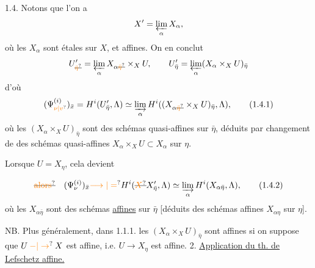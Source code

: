 1.4. Notons que l'on a
\[
X'=\varprojlim_\alpha X_\alpha,
\]
où les $X_\alpha$ sont étales sur $X$, et affines. On en conclut
\[
U'_{\deleted{\unsure{\bar\eta}}}=\varprojlim_\alpha X_{\alpha\deleted{\unsure{\bar\eta}}}\times_X U,\qquad
U'_{\bar\eta}=\varprojlim_\alpha(X_\alpha\times_X U)_{\bar\eta}
\]
d'où
\[
(\Psi^{(i)}_{\unsure{\nu|v}})_{\bar x}=H^i(U'_{\bar\eta},\Lambda)\simeq
\varinjlim_\alpha H^i((X_{\alpha\deleted{\unsure{\bar\eta}}}\times_X U)_{\bar\eta},\Lambda),
\tag*{(1.4.1)}
\]
où les  $(X_\alpha\times_X U)_{\bar\eta}$ sont des schémas  quasi-affines sur $\bar\eta$, déduits par changement de  des schémas quasi-affines $X_\alpha\times_X U\subset X_\alpha$ sur $\eta$.

Lorsque $U=X_\eta$, cela devient

\[
\deleted{\unsure{\text{alors}}}\quad
(\Psi^{(i)}_\nu)_{\bar x}\unsure{\longrightarrow|=}H^i(\deleted{\unsure{X}}X'_{\bar\eta},\Lambda)\simeq
\varinjlim_\alpha H^i(X_{\alpha\bar\eta},\Lambda),
\tag*{(1.4.2)}
\]
où les $X_{\alpha\bar\eta}$ sont des schémas  \uline{affines} sur $\bar\eta$ [déduits des schémas affines $X_{\alpha\eta}$ sur $\eta$]. 

NB. Plus généralement, dans 1.1.1. les $(X_\alpha\times_X U)_{\bar\eta}$ sont affines si on suppose que $U\mathbin{\unsure{-|\to}}X$ est affine, i.e. $U\to X_\eta$ est affine.
2. \uline{Application du th. de Lefschetz affine.}

